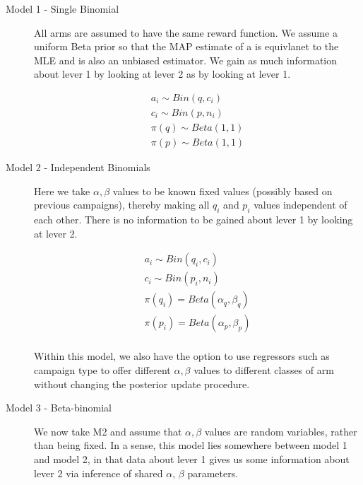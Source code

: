 \documentclass[11pt,a4,singlespacing,titlepagenumber=on]{scrreprt}
\numberwithin{equation}{chapter} %
\theoremstyle{remark}
\begin{document}
\begin{description}
	\item[Model 1 - Single Binomial]
All arms are assumed to have the same reward function. We assume a uniform Beta prior so that the MAP estimate of a is equivlanet to the MLE and is also an unbiased estimator. We gain as much information about lever 1 by looking at lever 2 as by looking at lever 1.

  \begin{align}
	a_i \sim Bin(q,c_i) \\
	c_i \sim Bin(p,n_i) \\
	\pi(q) \sim Beta(1,1) \\
	\pi(p) \sim Beta(1,1) 
  \end{align}

	\item[Model 2 - Independent Binomials]
Here we take $\alpha, \beta$ values to be known fixed values (possibly based on previous campaigns), thereby making all $q_i$ and $p_i$ values independent of each other. There is no information to be gained about lever 1 by looking at lever 2.

  \begin{align}
	a_i \sim Bin(q_i,c_i) \\
	c_i \sim Bin(p_i,n_i) \\
	\pi(q_i) = Beta(\alpha_q,\beta_q) \\
	\pi(p_i) = Beta(\alpha_p,\beta_p) \\
  \end{align}

Within this model, we also have the option to use regressors such as campaign type to offer different $\alpha, \beta$ values to different classes of arm without changing the posterior update procedure.

	\item[Model 3 - Beta-binomial]



We now take M2 and assume that $\alpha, \beta$ values are random variables, rather than being fixed. In a sense, this model lies somewhere between model 1 and model 2, in that data about lever 1 gives us some information about lever 2 via inference of shared $\alpha$, $\beta$ parameters. 


\end{description}
\end{document}
